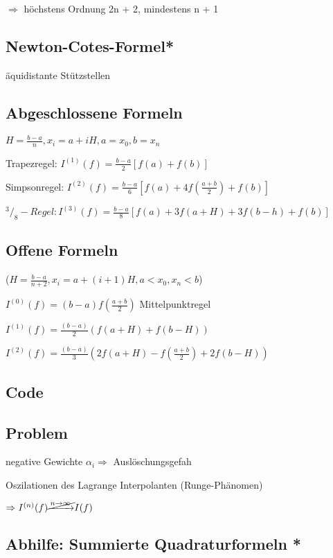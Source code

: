 \documentclass[12pt,a4paper]{article} %
\newcommand*\tab[1][1cm]{\hspace*{#1}}
\newcommand*\rfrac[2]{{}^{#1}\!/_{#2}} %
\begin{document}
	$\Rightarrow$ höchstens Ordnung 2n + 2, mindestens n + 1
	
	\subsection{Newton-Cotes-Formel*}
	
	äquidistante Stützstellen
	
	\subsection{Abgeschlossene Formeln}
	
	$H = \frac{b - a}{n}, x_i = a + iH, a = x_0, b = x_n$
	
	Trapezregel: $I^{(1)}(f) = \frac{b - a}{2}[f(a) + f(b)]$
	
	Simpsonregel: $I^{(2)}(f) = \frac{b - a}{6}[f(a) + 4f(\frac{a + b}{2}) + f(b)]$
	
	$\rfrac{3}{8}-Regel: I^{(3)}(f) = \frac{b - a}{8}[f(a) + 3f(a + H) + 3f(b - h) + f(b)]$
	
	\subsection{Offene Formeln}
	
	($H = \frac{b - a}{n + 2}, x_i = a + (i + 1)H, a < x_0, x_n < b$)
	
	$I^{(0)}(f) = (b - a)f(\frac{a + b}{2})$ \tab Mittelpunktregel
	
	$I^{(1)}(f) = \frac{(b - a)}{2}(f(a + H) + f(b - H))$
	
	$I^{(2)}(f) = \frac{(b-  a)}{3}(2f(a + H) - f(\frac{a + b}{2}) + 2f(b - H))$
	
	\subsection{Code}
	
	\subsection{Problem}
	
	negative Gewichte $\alpha_i \Rightarrow$ Auslöschungsgefah
	
	Oszilationen des Lagrange Interpolanten (Runge-Phänomen) 
	
	$\Rightarrow I^{(n)}(f)\cancel{\xrightarrow{n \rightarrow\infty}}I(f) $
	
	\subsection{Abhilfe: Summierte Quadraturformeln *}
	
\end{document}
